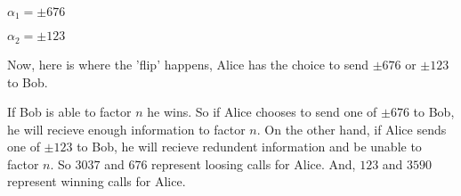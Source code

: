 \documentclass{article}
\begin{document}
$\alpha_{1} = \pm 676$

$\alpha_{2} = \pm 123$

Now, here is where the 'flip' happens,
Alice has the choice to send $\pm 676$ or $\pm 123$ to Bob.

If Bob is able to factor $n$ he wins. So if Alice chooses to send one of $\pm 676$ to Bob, he will recieve enough information to factor $n$.
On the other hand, if Alice sends one of $\pm 123$ to Bob, he will recieve redundent information and
be unable to factor $n$.
\newline
So $3037$ and $676$ represent loosing calls for Alice.
And, $123$ and $3590$ represent winning calls for Alice.
\end{document}
